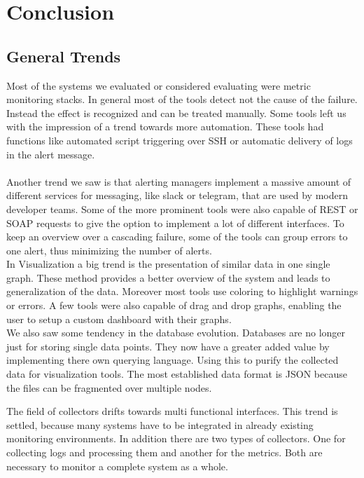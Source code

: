 
\chapter{Conclusion}\label{chap:conclusion}
\section{General Trends}
Most of the systems we evaluated or considered evaluating were metric monitoring stacks. In general most of the tools detect not the cause of the failure. Instead the effect is recognized and can be treated manually. Some tools left us with the impression of a trend towards more automation. These tools had functions like automated script triggering over SSH or automatic delivery of logs in the alert message. \\
\\
Another trend we saw is that alerting managers implement a massive amount of different services for messaging, like slack or telegram, that are used by modern developer teams. Some of the more prominent tools were also capable of REST or SOAP requests to give the option to implement a lot of different interfaces. To keep an overview over a cascading failure, some of the tools can group errors to one alert, thus minimizing the number of alerts.
\\
In Visualization a big trend is the presentation of similar data in one single graph. These method provides a better overview of the system and leads to generalization of the data. Moreover most tools use coloring to highlight warnings or errors. A few tools were also capable of drag and drop graphs, enabling the user to setup a custom dashboard with their graphs.
\\
We also saw some tendency in the database evolution. Databases are no longer just for storing single data points. They now have a greater added value by implementing there own querying language. Using this to purify the collected data for visualization tools. The most established data format is JSON because the files can be fragmented over multiple nodes.

The field of collectors drifts towards multi functional interfaces. This trend is settled, because many systems have to be integrated in already existing monitoring environments. In addition there are two types of collectors. One for collecting logs and processing them and another for the metrics. Both are necessary to monitor a complete system as a whole.

